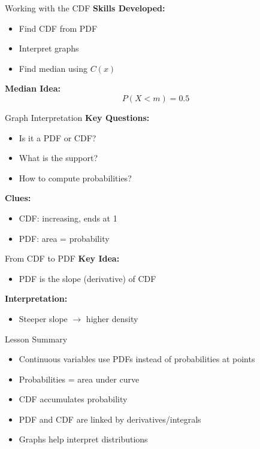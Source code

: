 \documentclass[dvipsnames]{beamer}
\begin{document}

\begin{frame}{Working with the CDF}
\textbf{Skills Developed:}
\begin{itemize}
    \item Find CDF from PDF
    \item Interpret graphs
    \item Find median using $C(x)$
\end{itemize}

\textbf{Median Idea:}
\[
P(X < m) = 0.5
\]
\end{frame}


\begin{frame}{Graph Interpretation}
\textbf{Key Questions:}
\begin{itemize}
    \item Is it a PDF or CDF?
    \item What is the support?
    \item How to compute probabilities?
\end{itemize}

\textbf{Clues:}
\begin{itemize}
    \item CDF: increasing, ends at 1
    \item PDF: area = probability
\end{itemize}
\end{frame}


\begin{frame}{From CDF to PDF}
\textbf{Key Idea:}
\begin{itemize}
    \item PDF is the slope (derivative) of CDF
\end{itemize}

\textbf{Interpretation:}
\begin{itemize}
    \item Steeper slope $\rightarrow$ higher density
\end{itemize}
\end{frame}


\begin{frame}{Lesson Summary}
\begin{itemize}
    \item Continuous variables use PDFs instead of probabilities at points
    \item Probabilities = area under curve
    \item CDF accumulates probability
    \item PDF and CDF are linked by derivatives/integrals
    \item Graphs help interpret distributions
\end{itemize}
\end{frame}
\end{document}
